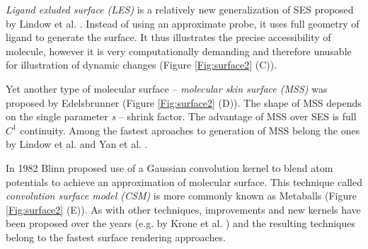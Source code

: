 \textit{Ligand exluded surface (LES)} is a relatively new generalization of SES proposed by Lindow et al. \cite{lindow2014ligand}. Instead of using an approximate probe, it uses full geometry of ligand to generate the surface. It thus illustrates the precise accessibility of molecule, however it is very computationally demanding and therefore unusable for illustration of dynamic changes (Figure \ref{Fig:surface2} (C)).

Yet another type of molecular surface -- \textit{molecular skin surface (MSS)} was proposed by Edelsbrunner \cite{edelsbrunner1999deformable} (Figure \ref{Fig:surface2} (D)). The shape of MSS depends on the single parameter \textit{s} -- shrink factor. The advantage of MSS over SES is full $C^1$ continuity.  Among the fastest aproaches to generation of MSS belong the ones by Lindow et al. \cite{lindow2010accelerated} and Yan et al. \cite{Yan2017}.

In 1982 Blinn \cite{blinn1982generalization} proposed use of a Gaussian convolution
kernel to blend atom potentials to achieve an approximation of molecular surface. This technique called \textit{convolution surface model (CSM)} is more commonly known as Metaballs (Figure \ref{Fig:surface2} (E)). As with other techniques, improvements and new kernels have been proposed over the years (e.g. by Krone et al. \cite{krone2012fast}) and the resulting techniques belong to the fastest surface rendering approaches. 

